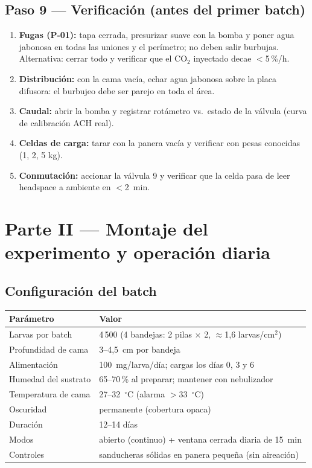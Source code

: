 \documentclass[11pt,a4paper]{article}
\newcommand{\paso}[1]{\subsection*{\large Paso #1}}
\begin{document}
\paso{9 --- Verificación (antes del primer batch)}
\begin{enumerate}
  \item \textbf{Fugas (P-01):} tapa cerrada, presurizar suave con la bomba y
        poner agua jabonosa en todas las uniones y el perímetro; no deben
        salir burbujas. Alternativa: cerrar todo y verificar que el CO$_2$
        inyectado decae $<$5\,\%/h.
  \item \textbf{Distribución:} con la cama vacía, echar agua jabonosa sobre la
        placa difusora: el burbujeo debe ser parejo en toda el área.
  \item \textbf{Caudal:} abrir la bomba y registrar rotámetro vs.\ estado de
        la válvula (curva de calibración ACH real).
  \item \textbf{Celdas de carga:} tarar con la panera vacía y verificar con
        pesas conocidas (1, 2, 5 kg).
  \item \textbf{Conmutación:} accionar la válvula 9 y verificar que la celda
        pasa de leer headspace a ambiente en $<$2~min.
\end{enumerate}

\newpage
\section{Parte II --- Montaje del experimento y operación diaria}

\subsection{Configuración del batch}
\begin{center}
\begin{tabular}{@{}ll@{}}
\toprule
\textbf{Parámetro} & \textbf{Valor} \\
\midrule
Larvas por batch & 4\,500 (4 bandejas: 2 pilas $\times$ 2,
${\approx}$1,6 larvas/cm$^2$) \\
Profundidad de cama & 3--4,5~cm por bandeja \\
Alimentación & 100~mg/larva/día; cargas los días 0, 3 y 6 \\
Humedad del sustrato & 65--70\,\% al preparar; mantener con nebulizador \\
Temperatura de cama & 27--32~$^\circ$C (alarma $>$33~$^\circ$C) \\
Oscuridad & permanente (cobertura opaca) \\
Duración & 12--14 días \\
Modos & abierto (continuo) + ventana cerrada diaria de 15~min \\
Controles & sanducheras sólidas en panera pequeña (sin aireación) \\
\bottomrule
\end{tabular}
\end{center}
\end{document}
